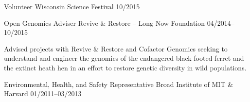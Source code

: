\begin{cventries}
  \cventry
    {Volunteer} %
    {Wisconsin Science Festival} %
    {} %
    {10/2015} %
    {}
 
  \cventry
    {Open Genomics Adviser} %
    {Revive \& Restore -- Long Now Foundation} %
    {} %
    {04/2014--10/2015} %
    {
      \begin{cvitems} %
        \item {Advised projects with Revive \& Restore and Cofactor Genomics seeking to understand and engineer the genomics of the endangered black-footed ferret and the extinct heath hen in an effort to restore genetic diversity in wild populations.}
      \end{cvitems}
    }

  \cventry
    {Environmental, Health, and Safety Representative} %
    {Broad Institute of MIT \& Harvard} %
    {} %
    {01/2011--03/2013} %
    {}   
    
\end{cventries}